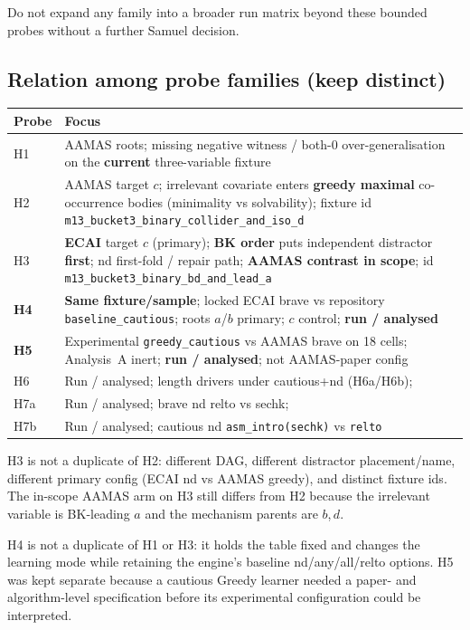 \documentclass[11pt]{article}
\begin{document}
Do not expand any family into a broader run matrix beyond these bounded probes
without a further Samuel decision.

\subsection{Relation among probe families (keep distinct)}

\begin{center}
\begin{tabular}{@{}lL{0.72\textwidth}@{}}
\toprule
Probe & Focus \\
\midrule
H1 & AAMAS roots; missing negative witness / both-0 over-generalisation
  on the \textbf{current} three-variable fixture \\
H2 & AAMAS target \(c\); irrelevant covariate enters \textbf{greedy maximal}
  co-occurrence bodies (minimality vs solvability); fixture id
  \texttt{m13\_bucket3\_binary\_collider\_and\_iso\_d} \\
H3 & \textbf{ECAI} target \(c\) (primary); \textbf{BK order} puts independent
  distractor \textbf{first}; nd first-fold / repair path;
  \textbf{AAMAS contrast in scope}; id
  \texttt{m13\_bucket3\_binary\_bd\_and\_lead\_a} \\
\textbf{H4} & \textbf{Same fixture/sample}; locked ECAI brave vs
  repository \texttt{baseline\_cautious}; roots \(a\)/\(b\) primary; \(c\)
  control; \textbf{run / analysed} \\
\textbf{H5} & Experimental \texttt{greedy\_cautious} vs AAMAS brave on 18
  cells; Analysis~A inert; \textbf{run / analysed}; not AAMAS-paper config \\
H6 & Run / analysed; length drivers under cautious+nd (H6a/H6b);\\
H7a & Run / analysed; brave nd relto vs sechk;\\
H7b & Run / analysed;
  cautious nd \texttt{asm\_intro(sechk)} vs \texttt{relto} \\
\bottomrule
\end{tabular}
\end{center}

H3 is not a duplicate of H2: different DAG, different distractor
placement/name, different primary config (ECAI nd vs AAMAS greedy), and
distinct fixture ids. The in-scope AAMAS arm on H3 still differs from H2 because
the irrelevant variable is BK-leading \(a\) and the mechanism parents are
\(b\),\,\(d\).

H4 is not a duplicate of H1 or H3: it holds the table fixed and changes the
learning mode while retaining the engine's baseline nd/any/all/relto options.
H5 was kept separate because a cautious Greedy learner needed a paper- and
algorithm-level specification before its experimental configuration could be
interpreted.
\end{document}
